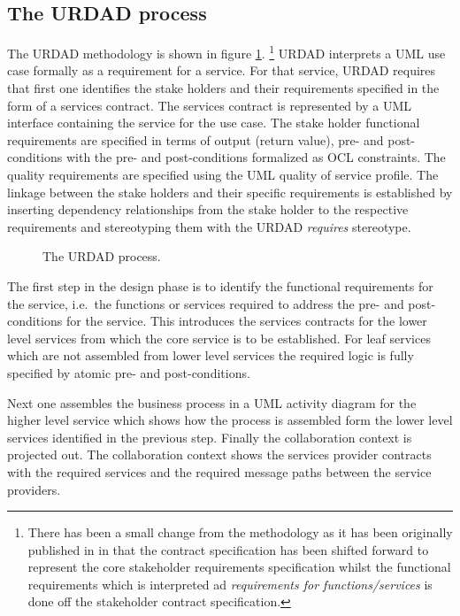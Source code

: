 
\subsection{The URDAD process}

The URDAD methodology is shown in figure \ref{fig:methodology}.
\footnote{There has been a small change from the methodology as it has been originally published in \cite{solms_2007:technologyNeutralBpdUsingUrdad} in that the contract specification has been shifted forward to represent the core stakeholder requirements specification whilst the functional requirements which is interpreted ad {\em requirements for functions/services} is done off the stakeholder contract specification.}
URDAD interprets a UML use case formally as a requirement for a service. For that service, URDAD requires that first one identifies the stake holders and their requirements specified in the form of a services contract. The services contract is represented by a UML interface containing the service for the use case. The stake holder functional requirements are specified in terms of output (return value), pre- and post-conditions with the pre- and post-conditions formalized as OCL constraints. The quality requirements are specified using the UML quality of service profile. The linkage between the stake holders and their specific requirements is established by inserting dependency relationships from the stake holder to the respective requirements and stereotyping them with the URDAD {\em requires} stereotype.

\begin{figure}[htb]
	\centering
	\caption{The URDAD process. \label{fig:methodology}}
\end{figure}

The first step in the design phase is to identify the functional requirements for the service, i.e.\ the functions or services required to address the pre- and post-conditions for the service. This introduces the services contracts for the lower level services from which the core service is to be established. For leaf services which are not assembled from lower level services the required logic is fully specified by atomic pre- and post-conditions.

Next one assembles the business process in a UML activity diagram for the higher level service which shows how the process is assembled form the lower level services identified in the previous step. Finally the collaboration context is projected out. The collaboration context shows the services provider contracts with the required services and the required message paths between the service providers.

